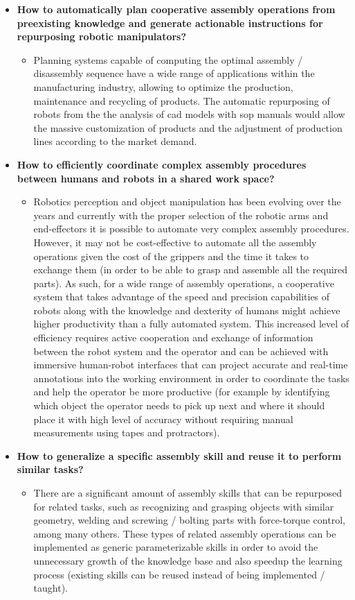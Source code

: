 \begin{itemize}
	\item \textbf{How to automatically plan cooperative assembly operations from preexisting knowledge and generate actionable instructions for repurposing robotic manipulators?}
	\begin{itemize}
		\item Planning systems capable of computing the optimal assembly / disassembly sequence have a wide range of applications within
		the manufacturing industry, allowing to optimize the production, maintenance and recycling of products. The automatic repurposing of robots from the the analysis of \gls{cad} models with \gls{sop} manuals would allow the massive customization of products and the adjustment of production lines according to the market demand.
	\end{itemize}

	\item \textbf{How to efficiently coordinate complex assembly procedures between humans and robots in a shared work space?}
	\begin{itemize}
		\item Robotics perception and object manipulation has been evolving over the years and currently with the proper selection of the robotic arms and end-effectors it is possible to automate very complex assembly procedures. However, it may not be cost-effective to automate all the assembly operations given the cost of the grippers and the time it takes to exchange them (in order to be able to grasp and assemble all the required parts). As such, for a wide range of assembly operations, a cooperative system that takes advantage of the speed and precision capabilities of robots along with the knowledge and dexterity of humans might achieve higher productivity than a fully automated system. This increased level of efficiency requires active cooperation and exchange of information between the robot system and the operator and can be achieved with immersive human-robot interfaces that can project accurate and real-time annotations into the working environment in order to coordinate the tasks and help the operator be more productive (for example by identifying which object the operator needs to pick up next and where it should place it with high level of accuracy without requiring manual measurements using tapes and protractors).
	\end{itemize}

	\item \textbf{How to generalize a specific assembly skill and reuse it to perform similar tasks?}
	\begin{itemize}
		\item There are a significant amount of assembly skills that can be repurposed for related tasks, such as recognizing and grasping objects with similar geometry, welding and screwing / bolting parts with force-torque control, among many others. These types of related assembly operations can be implemented as generic parameterizable skills in order to avoid the unnecessary growth of the knowledge base and also speedup the learning process (existing skills can be reused instead of being implemented / taught).
	\end{itemize}


\end{itemize}
